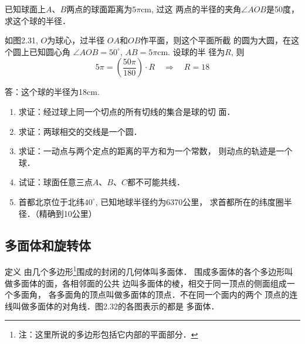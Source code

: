 \begin{example}
    已知球面上$A$、$B$两点的球面距离为$5\pi$cm, 过这
两点的半径的夹角$\angle AOB$是50度，求这个球的半径．
\end{example}


\begin{solution}
    如图2.31, $O$为球心，过半径
$OA$和$OB$作平面，则这个平面所截
的圆为大圆，在这个圆上已知圆心角
$\angle AOB=50^{\circ}$, $AB=5\pi$cm. 设球的半
径为$R$, 则
\[5\pi=\left(\frac{50\pi}{180}\right)\cdot R\quad \Rightarrow\quad R=18\]

答：这个球的半径为18cm.
\end{solution}

\begin{ex}
\begin{enumerate}
    \item 求证：经过球上同一个切点的所有切线的集合是球的切
    面．
    \item 求证：两球相交的交线是一个圆．
    \item 求证：一动点与两个定点的距离的平方和为一个常数，
    则动点的轨迹是一个球．
    \item 试证：球面任意三点$A$、$B$、$C$都不可能共线．
    \item 
    首都北京位于北纬$40^{\circ}$, 已知地球半径约为6370公里，
    求首都所在的纬度圈半径．（精确到10公里）
\end{enumerate}
\end{ex}

\subsection{多面体和旋转体}
\begin{blk}
{定义} 由几个多边形\footnote{注：这里所说的多边形包括它内部的平面部分．}围成的封闭的几何体叫多面体．
围成多面体的各个多边形叫做多面体的面，各相邻面的公共
边叫多面体的棱，相交于同一顶点的侧面组成一个多面角，
各多面角的顶点叫做多面体的顶点．不在同一个面内的两个
顶点的连线叫做多面体的对角线．图2.32的各图表示的都是
多面体．    
\end{blk}

